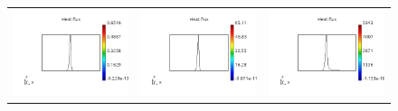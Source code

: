 \documentclass[review]{elsarticle}
\begin{document}
\begin{figure}[tbh]
\begin{center}
\begin{tabular}{ccc}
	  \includegraphics[width=\psize\textwidth]{figs/hflux_p71D1e12.png} &
      \includegraphics[width=\psize\textwidth]{figs/hflux_p71D1e10.png} &
      \includegraphics[width=\psize\textwidth]{figs/hflux_p71D1e8.png} \\

\end{tabular}
\end{center}
\end{figure}
\end{document}
